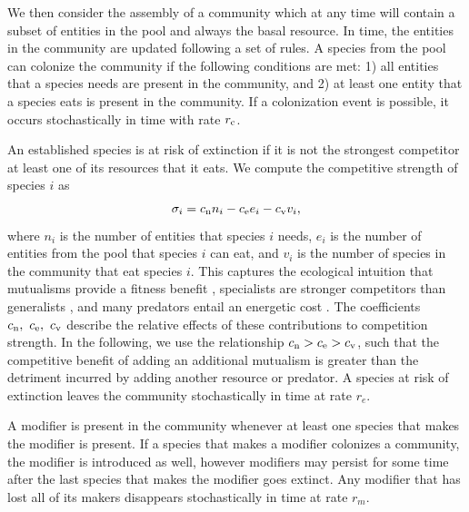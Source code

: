 \documentclass[twocolumn,preprintnumbers,amsmath,amssymb,superscriptaddress,linenumbers]{revtex4-1}
\newcommand{\rr}[1]{{\rm #1}}
\begin{document}
{  We then consider the assembly of a community which at any time will contain a subset of entities in the pool and always the basal resource.
  In time, the entities in the community are updated following a set of rules.
  A species from the pool can colonize the community if the following conditions are met:
  1) all entities that a species needs are present in the community, and
  2) at least one entity that a species eats is present in the community.
  If a colonization event is possible, it occurs stochastically in time with rate $r_\rr{c}$.

  An established species is at risk of extinction if it is not the strongest competitor at least one of its resources that it eats.
  We compute the competitive strength of species $i$ as
  \begin{equation}
    \sigma_i = c_\rr{n} n_i - c_\rr{e} e_i - c_\rr{v} v_i,
  \end{equation}
  where $n_i$ is the number of entities that species $i$ needs, $e_i$ is the number of entities from the pool that species $i$ can eat, and $v_i$ is the number of species in the community that eat species $i$.
  This captures the ecological intuition that mutualisms provide a fitness benefit \cite{Bronstein1994}, specialists are stronger competitors than generalists \cite{Futuyma1988}, and many predators entail an energetic cost \cite{Brown1994}.
  The coefficients $c_\rr{n},~c_\rr{e},~c_\rr{v}$ describe the relative effects of these contributions to competition strength.
  In the following, we use the relationship $c_\rr{n} > c_\rr{e} > c_\rr{v}$, such that the competitive benefit of adding an additional mutualism is greater than the detriment incurred by adding another resource or predator.
  A species at risk of extinction leaves the community stochastically in time at rate $r_e$.

  A modifier is present in the community whenever at least one species that makes the modifier is present.
  If a species that makes a modifier colonizes a community, the modifier is introduced as well, however modifiers may persist for some time after the last species that makes the modifier goes extinct.
  Any modifier that has lost all of its makers disappears stochastically in time at rate $r_m$.

}
\end{document}

